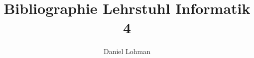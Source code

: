 \documentclass[11pt]{article}
\begin{document}
\title{
    Bibliographie Lehrstuhl Informatik 4
}

\author{Daniel Lohman}


\nocite{*}
\printbibliography
\end{document}
